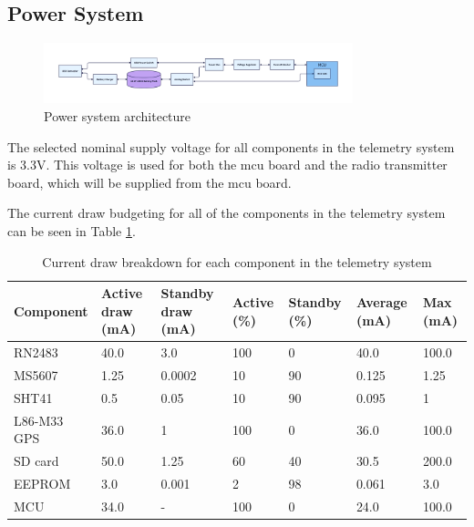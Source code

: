 \subsection{Power System}

\begin{figure}
    \centering
    \includegraphics[width=0.8\textwidth]{assets/diagrams/power_system.png}
    \caption{Power system architecture}
    \label{fig:power-system}
\end{figure}

The selected nominal supply voltage for all components in the telemetry system is 3.3V. This voltage is used for both
the \gls{mcu} board and the radio transmitter board, which will be supplied from the \gls{mcu} board.

The current draw budgeting for all of the components in the telemetry system can be seen in Table \ref{tbl:draw}.

\begin{table}[H]
    \centering
    \begin{tabular}{| p{0.8in} | p{0.5in} | p{0.5in} | p{0.5in} | p{0.5in} | p{0.5in} | p{0.5in} |}
        \hline
        Component   & Active draw (mA) & Standby draw (mA) & Active (\%) & Standby (\%) & Average (mA) & Max (mA) \\
        \hline
        RN2483      & 40.0             & 3.0               & 100         & 0            & 40.0         & 100.0    \\
        \hline
        MS5607      & 1.25             & 0.0002            & 10          & 90           & 0.125        & 1.25     \\
        \hline
        SHT41       & 0.5              & 0.05              & 10          & 90           & 0.095        & 1        \\
        \hline
        L86-M33 GPS & 36.0             & 1                 & 100         & 0            & 36.0         & 100.0    \\
        \hline
        SD card     & 50.0             & 1.25              & 60          & 40           & 30.5         & 200.0    \\
        \hline
        EEPROM      & 3.0              & 0.001             & 2           & 98           & 0.061        & 3.0      \\
        \hline
        MCU         & 34.0             & -                 & 100         & 0            & 24.0         & 100.0    \\
        \hline
    \end{tabular}
    \caption{Current draw breakdown for each component in the telemetry system}
    \label{tbl:draw}
\end{table}

